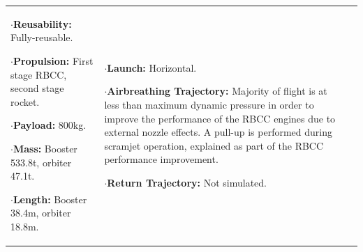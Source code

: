 {\begin{landscape}
\begin{xltabular}{\linewidth}{|X|X|X|}
	$\cdot$\textbf{Reusability:} Fully-reusable. 
	
	$\cdot$\textbf{Propulsion:} First stage RBCC, second stage rocket. 
	
	$\cdot$\textbf{Payload:} 800kg.

	 $\cdot$\textbf{Mass:} Booster 533.8t, orbiter 47.1t.
	 
	 $\cdot$\textbf{Length:} Booster 38.4m, orbiter 18.8m. 
	 
	
	&\small
	
	$\cdot$\textbf{Launch:} Horizontal. 
	
	$\cdot$\textbf{Airbreathing Trajectory:} Majority of flight is at less than maximum dynamic pressure in order to improve the performance of the RBCC engines due to external nozzle effects. A pull-up is performed during scramjet operation, explained as part of the RBCC performance improvement.

	
	$\cdot$\textbf{Return Trajectory:} Not simulated. 
	

\end{xltabular}
\end{landscape}}
